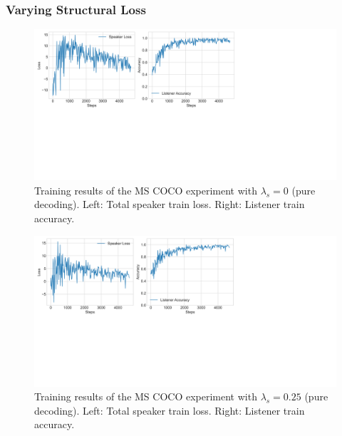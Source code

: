 \subsubsection{Varying Structural Loss}


\begin{figure}
	\centering
	\includegraphics[width=\linewidth]{images/shapes_refgame_49_pure_0_random.png}
	\caption{Training results of the MS COCO experiment with $\lambda_s = 0$ (pure decoding). Left: Total speaker train loss. Right: Listener train accuracy.}
	\label{fig:3dshapes_baseline_0_speaker_loss_listener_acc}
\end{figure}

\begin{figure}
	\centering
	\includegraphics[width=\linewidth]{images/shapes_refgame_49_pure_025_random.png}
	\caption{Training results of the MS COCO experiment with $\lambda_s = 0.25$ (pure decoding). Left: Total speaker train loss. Right: Listener train accuracy.}
	\label{fig:3dshapes_baseline_025_speaker_loss_listener_acc}
\end{figure}

